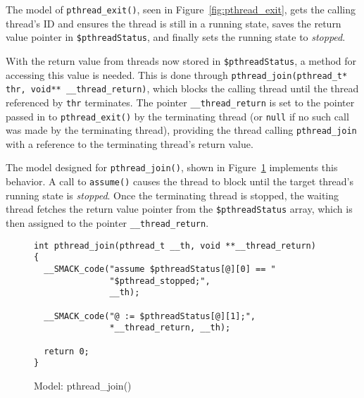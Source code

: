The model of \lstinline|pthread_exit()|, seen in
Figure~\ref{fig:pthread_exit}, gets the calling thread's ID and
ensures the thread is still in a running state, saves the return value
pointer in \lstinline|$pthreadStatus|, and finally sets the running
state to \emph{stopped}.

With the return value from threads now stored in
\lstinline|$pthreadStatus|, a method for accessing this value is
needed.  This is done through 
\lstinline[breaklines]|pthread_join(pthread_t* thr, void** __thread_return)|,
which blocks the calling thread until the thread referenced by 
\lstinline|thr| terminates. The pointer \lstinline|__thread_return| is
set to the pointer passed in to \lstinline|pthread_exit()| by the
terminating thread (or \lstinline|null| if no such call was made by
the terminating thread), providing the thread calling
\lstinline|pthread_join| with a reference to the terminating thread's
return value.


The model designed for \lstinline|pthread_join()|, shown in
Figure~\ref{fig:pthread_join} implements this behavior.  A call to
\lstinline|assume()| causes the thread to block until the target
thread's running state is \emph{stopped}.  Once the terminating thread
is stopped, the waiting thread fetches the return value pointer from
the \lstinline|$pthreadStatus| array, which is then assigned to the
pointer \lstinline|__thread_return|.


\begin{figure}[!ht]
\centering
\begin{lstlisting}
int pthread_join(pthread_t __th, void **__thread_return)
{
  __SMACK_code("assume $pthreadStatus[@][0] == "
               "$pthread_stopped;",
               __th);

  __SMACK_code("@ := $pthreadStatus[@][1];",
               *__thread_return, __th);

  return 0;
}

\end{lstlisting}
\caption{Model: pthread\_join()}\label{fig:pthread_join}
\end{figure}

